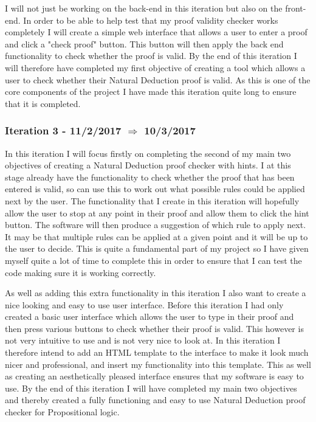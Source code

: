 I will not just be working on the back-end in this iteration but also on the front-end. In order to be able to help test that my proof validity checker works completely I will create a simple web interface that allows a user to enter a proof and click a "check proof" button. This button will then apply the back end functionality to check whether the proof is valid. By the end of this iteration I will therefore have completed my first objective of creating a tool which allows a user to check whether their Natural Deduction proof is valid. As this is one of the core components of the project I have made this iteration quite long to ensure that it is completed.

\subsubsection{Iteration 3 - 11/2/2017 $\Rightarrow$ 10/3/2017}

In this iteration I will focus firstly on completing the second of my main two objectives of creating a Natural Deduction proof checker with hints. I at this stage already have the functionality to check whether the proof that has been entered is valid, so can use this to work out what possible rules could be applied next by the user. The functionality that I create in this iteration will hopefully allow the user to stop at any point in their proof and allow them to click the hint button. The software will then produce a suggestion of which rule to apply next. It may be that multiple rules can be applied at a given point and it will be up to the user to decide. This is quite a fundamental part of my project so I have given myself quite a lot of time to complete this in order to ensure that I can test the code making sure it is working correctly.

As well as adding this extra functionality in this iteration I also want to create a nice looking and easy to use user interface. Before this iteration I had only created a basic user interface which allows the user to type in their proof and then press various buttons to check whether their proof is valid. This however is not very intuitive to use and is not very nice to look at. In this iteration I therefore intend to add an HTML template to the interface to make it look much nicer and professional, and insert my functionality into this template. This as well as creating an aesthetically pleased interface ensures that my software is easy to use. By the end of this iteration I will have completed my main two objectives and thereby created a fully functioning and easy to use Natural Deduction proof checker for Propositional logic.


